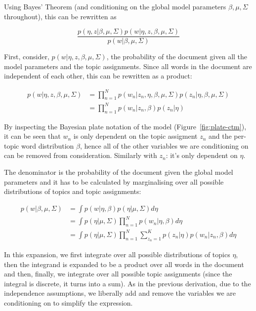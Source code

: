 \documentclass[12pt,a4paper,twoside,openright]{report}
\begin{document}
Using Bayes' Theorem (and conditioning on the global model parameters $\beta, \mu, \Sigma$ throughout), this can be rewritten as 

\begin{equation}
\frac{p(\eta, z | \beta, \mu, \Sigma) p(w | \eta, z, \beta, \mu, \Sigma)}{p(w | \beta, \mu, \Sigma)}
\end{equation}

First, consider, $p(w | \eta, z, \beta, \mu, \Sigma)$, the probability of the document given all the model parameters and the topic assignments. Since all words in the document are independent of each other, this can be rewritten as a product:

\begin{align}
p(w | \eta, z, \beta, \mu, \Sigma) &= \prod\limits_{n=1}^N p(w_n | z_n, \eta, \beta, \mu, \Sigma) p(z_n | \eta, \beta, \mu, \Sigma)\\
& = \prod\limits_{n=1}^N p(w_n | z_n, \beta) p(z_n | \eta)
\end{align}

By inspecting the Bayesian plate notation of the model (Figure~\ref{fig:plate-ctm}), it can be seen that $w_n$ is only dependent on the topic assigment $z_n$ and the per-topic word distribution $\beta$, hence all of the other variables we are conditioning on can be removed from consideration. Similarly with $z_n$: it's only dependent on $\eta$.

The denominator is the probability of the document given the global model parameters and it has to be calculated by marginalising over all possible distributions of topics and topic assignments:

\begin{align}
p(w | \beta, \mu, \Sigma) & = \int p(w | \eta, \beta) p(\eta | \mu, \Sigma) d\eta \\
& =\int p(\eta | \mu, \Sigma)  \prod\limits_{n=1}^N p(w_n | \eta, \beta) d\eta \\
& =\int p(\eta | \mu, \Sigma)  \prod\limits_{n=1}^N \sum\limits_{z_n=1}^K p(z_n | \eta) p(w_n | z_n, \beta) d\eta
\end{align}

In this expansion, we first integrate over all possible distributions of topics $\eta$, then the integrand is expanded to be a product over all words in the document and then, finally, we integrate over all possible topic assignments (since the integral is discrete, it turns into a sum). As in the previous derivation, due to the independence assumptions, we liberally add and remove the variables we are conditioning on to simplify the expression.
\end{document}
